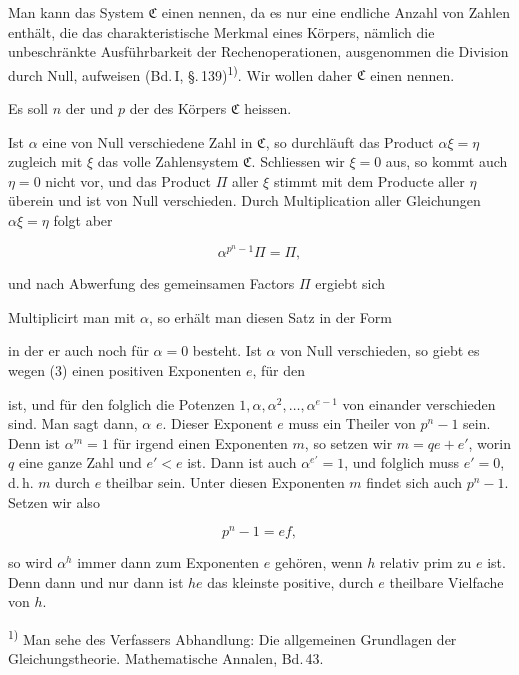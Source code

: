 Man kann das System $\mathfrak{C}$ einen  nennen, da es nur eine endliche Anzahl von Zahlen enthält, die das charakteristische Merkmal eines Körpers, nämlich die unbeschränkte Ausführbarkeit der Rechenoperationen, ausgenommen die Division durch Null, aufweisen (Bd.\,I, \S.\,139)\textsuperscript{1)}. Wir wollen daher $\mathfrak{C}$ einen  nennen.

Es soll $n$ der  und $p$ der  des Körpers $\mathfrak{C}$ heissen.

Ist $\alpha$ eine von Null verschiedene Zahl in $\mathfrak{C}$, so durchläuft das Product $\alpha\xi = \eta$ zugleich mit $\xi$ das volle Zahlensystem $\mathfrak{C}$. Schliessen wir $\xi = 0$ aus, so kommt auch $\eta = 0$ nicht vor, und das Product $\Pi$ aller $\xi$ stimmt mit dem Producte aller $\eta$ überein und ist von Null verschieden. Durch Multiplication aller Gleichungen $\alpha\xi = \eta$ folgt aber

\[
\alpha^{p^n-1}\Pi = \Pi,
\]

und nach Abwerfung des gemeinsamen Factors $\Pi$ ergiebt sich



Multiplicirt man mit $\alpha$, so erhält man diesen Satz in der Form


in der er auch noch für $\alpha = 0$ besteht. Ist $\alpha$ von Null verschieden, so giebt es wegen (3) einen  positiven Exponenten $e$, für den


ist, und für den folglich die Potenzen $1, \alpha, \alpha^2, \ldots, \alpha^{e-1}$ von einander verschieden sind. Man sagt dann, $\alpha$  $e$. Dieser Exponent $e$ muss ein Theiler von $p^n - 1$ sein. Denn ist $\alpha^m = 1$ für irgend einen Exponenten $m$, so setzen wir $m = qe + e'$, worin $q$ eine ganze Zahl und $e' < e$ ist. Dann ist auch $\alpha^{e'} = 1$, und folglich muss $e' = 0$, d.\,h. $m$ durch $e$ theilbar sein. Unter diesen Exponenten $m$ findet sich auch $p^n - 1$. Setzen wir also

\[
p^n - 1 = ef,
\]

so wird $\alpha^h$ immer dann zum Exponenten $e$ gehören, wenn $h$ relativ prim zu $e$ ist. Denn dann und nur dann ist $he$ das kleinste positive, durch $e$ theilbare Vielfache von $h$.

\textsuperscript{1)} Man sehe des Verfassers Abhandlung: Die allgemeinen Grundlagen der  Gleichungstheorie. Mathematische Annalen, Bd.\,43.
